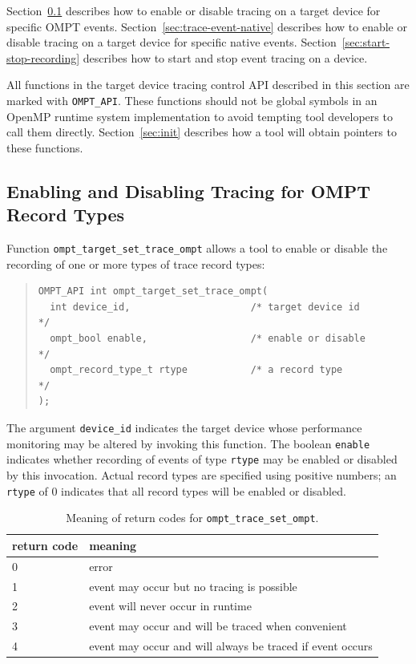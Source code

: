 \documentclass{article}
\begin{document}
 Section~\ref{sec:trace-event}  describes how to enable or disable tracing on a target device for specific OMPT events. 
  Section~\ref{sec:trace-event-native}  describes how to enable or disable tracing on a target device for specific native events. Section~\ref{sec:start-stop-recording} describes how to start and stop event tracing on a device. 
  
All functions in the target device tracing control API described in this section are marked with \verb|OMPT_API|. These functions should not be global symbols in an OpenMP runtime system implementation to avoid tempting tool developers to call them directly. Section~\ref{sec:init} describes how a tool will obtain pointers to these functions.



\subsection{Enabling and Disabling Tracing for OMPT Record Types}
\label{sec:trace-event}
Function \verb|ompt_target_set_trace_ompt| allows a tool to enable or disable the recording of one or more types of trace record types:

\begin{quote}
\begin{verbatim}
OMPT_API int ompt_target_set_trace_ompt(
  int device_id,                     /* target device id          */
  ompt_bool enable,                  /* enable or disable         */
  ompt_record_type_t rtype           /* a record type             */
);
\end{verbatim}
\end{quote}
The argument \verb|device_id| indicates the target device whose performance monitoring may be altered by invoking this function. The boolean \verb|enable| indicates whether recording of events of type \verb|rtype| may be enabled or disabled by this invocation.
Actual record types are specified using positive numbers; an \verb|rtype| of  0 indicates that all record types will be enabled or disabled.

\begin{table}
\centering
\begin{tabular}{|l|l|}
\hline
return code & meaning \\\hline
0 & error\\\hline
1 & event may occur but no tracing is possible\\\hline
2 & event will never occur in runtime\\\hline
3 & event may occur and will be traced  when convenient\\\hline
4 & event may occur and will always be traced if event occurs\\\hline
\end{tabular}
\caption{Meaning of return codes for {\tt ompt\_trace\_set\_ompt}.}
\label{table:record_set}
\end{table}
\end{document}
